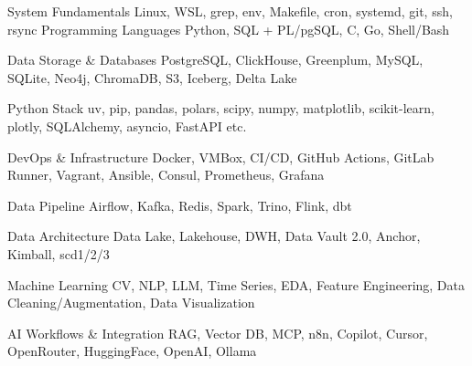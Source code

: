 


\begin{cvskills}

  \cvskill
    {System Fundamentals} %
    {Linux, WSL, grep, env, Makefile, cron, systemd, git, ssh, rsync} %
  \cvskill
    {Programming Languages} %
    {Python, SQL + PL/pgSQL, C, Go, Shell/Bash} %

  \cvskill
    {Data Storage \& Databases} %
    {PostgreSQL, ClickHouse, Greenplum, MySQL, SQLite, Neo4j, ChromaDB, S3, Iceberg, Delta Lake} %

  \cvskill
    {Python Stack} %
    {uv, pip, pandas, polars, scipy, numpy, matplotlib, scikit-learn, plotly, SQLAlchemy, asyncio, FastAPI etc.} %

  \cvskill
    {DevOps \& Infrastructure} %
    {Docker, VMBox, CI/CD, GitHub Actions, GitLab Runner, Vagrant, Ansible, Consul, Prometheus, Grafana} %

  \cvskill
    {Data Pipeline} %
    {Airflow, Kafka, Redis, Spark, Trino, Flink, dbt} %

  \cvskill
    {Data Architecture} %
    {Data Lake, Lakehouse, DWH, Data Vault 2.0, Anchor, Kimball, scd1/2/3} %

  \cvskill
    {Machine Learning} %
    {CV, NLP, LLM, Time Series, EDA, Feature Engineering, Data Cleaning/Augmentation, Data Visualization} %

  \cvskill
    {AI Workflows \& Integration} %
    {RAG, Vector DB, MCP, n8n, Copilot, Cursor, OpenRouter, HuggingFace, OpenAI, Ollama} %

\end{cvskills}


